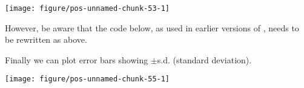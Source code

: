 \documentclass[paper=a4,headsepline,BCOR=12mm,twoside,open=right,%
titlepage,headings=small,fontsize=10pt,index=totoc,bibliography=totoc,%
captions=tableheading,captions=nooneline]{scrbook}\usepackage{knitr}
\begin{document}
\begin{knitrout}\footnotesize
{}\color{fgcolor}\begin{kframe}
\begin{alltt}
 \hlopt{+} \hlstd{(} \hlstd{=} \hlstd{,}  \hlstd{=} \hlstd{(} \hlstd{=} \hlstd{),}
                    \hlstd{=}\hlstd{,} \hlstd{=}\hlstd{,} \hlstd{=}\hlstd{)}
\end{alltt}
\end{kframe}

{\centering \texttt{[image: figure/pos-unnamed-chunk-53-1]} 

}



\end{knitrout}

However, be aware that the code below, as used in earlier versions of \ggplot, needs to be rewritten as above.

\begin{knitrout}\footnotesize
{}\color{fgcolor}\begin{kframe}
\begin{alltt}
 \hlopt{+} \hlstd{(} \hlstd{=} \hlstd{,}  \hlstd{=} \hlstd{,}
                    \hlstd{=}\hlstd{,} \hlstd{=}\hlstd{,} \hlstd{=}\hlstd{)}
\end{alltt}
\end{kframe}
\end{knitrout}

Finally we can plot error bars showing $\pm$s.d. (standard deviation).

\begin{knitrout}\footnotesize
{}\color{fgcolor}\begin{kframe}
\begin{alltt}
 \hlopt{+} \hlstd{(} \hlstd{=} \hlstd{,}
                    \hlstd{=}\hlstd{,} \hlstd{=}\hlstd{,} \hlstd{=}\hlstd{)}
\end{alltt}
\end{kframe}

{\centering \texttt{[image: figure/pos-unnamed-chunk-55-1]} 

}



\end{knitrout}
\end{document}
